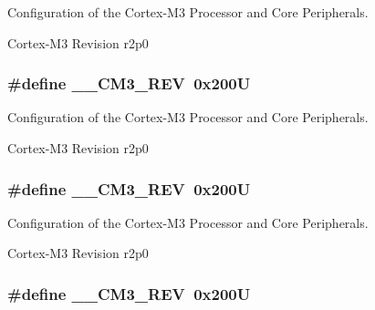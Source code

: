 Configuration of the Cortex-\/\-M3 Processor and Core Peripherals. 

Cortex-\/\-M3 Revision r2p0 \hypertarget{group___configuration__section__for___c_m_s_i_s_gac6a3f185c4640e06443c18b3c8d93f53}{
\subsubsection[{\-\_\-\-\_\-\-C\-M3\-\_\-\-R\-E\-V}]{\setlength{\rightskip}{0pt plus 5cm}\#define \-\_\-\-\_\-\-C\-M3\-\_\-\-R\-E\-V~0x200\-U}}\label{group___configuration__section__for___c_m_s_i_s_gac6a3f185c4640e06443c18b3c8d93f53}


Configuration of the Cortex-\/\-M3 Processor and Core Peripherals. 

Cortex-\/\-M3 Revision r2p0 \hypertarget{group___configuration__section__for___c_m_s_i_s_gac6a3f185c4640e06443c18b3c8d93f53}{
\subsubsection[{\-\_\-\-\_\-\-C\-M3\-\_\-\-R\-E\-V}]{\setlength{\rightskip}{0pt plus 5cm}\#define \-\_\-\-\_\-\-C\-M3\-\_\-\-R\-E\-V~0x200\-U}}\label{group___configuration__section__for___c_m_s_i_s_gac6a3f185c4640e06443c18b3c8d93f53}


Configuration of the Cortex-\/\-M3 Processor and Core Peripherals. 

Cortex-\/\-M3 Revision r2p0 \hypertarget{group___configuration__section__for___c_m_s_i_s_gac6a3f185c4640e06443c18b3c8d93f53}{
\subsubsection[{\-\_\-\-\_\-\-C\-M3\-\_\-\-R\-E\-V}]{\setlength{\rightskip}{0pt plus 5cm}\#define \-\_\-\-\_\-\-C\-M3\-\_\-\-R\-E\-V~0x200\-U}}\label{group___configuration__section__for___c_m_s_i_s_gac6a3f185c4640e06443c18b3c8d93f53}


